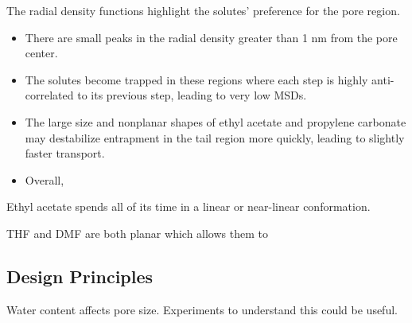 \documentclass{article}
\begin{document}
  The radial density functions highlight the solutes' preference for the 
  pore region.
  \begin{itemize}
  	\item There are small peaks in the radial density greater than 1 nm 
  	from the pore center.
  	\item The solutes become trapped in these regions where each step is
  	highly anti-correlated to its previous step, leading to very low MSDs.
  	\item The large size and nonplanar shapes of ethyl acetate and propylene 
  	carbonate may destabilize entrapment in the tail region more quickly, leading
  	to slightly faster transport. 
  	\item Overall, 
  \end{itemize}
  Ethyl acetate spends all of its time in a linear or near-linear conformation. %
  
  THF and DMF are both planar which allows them to 
  

  

%

  \subsection{Design Principles}

  Water content affects pore size. Experiments to understand this could be useful.
\end{document}
